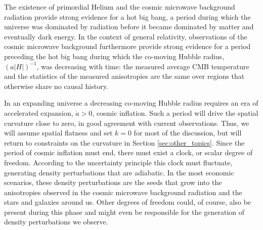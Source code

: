 The existence of primordial Helium and the cosmic microwave background radiation provide strong evidence for a hot big bang, a period during which the universe was dominated by radiation before it became dominated by matter and eventually dark energy. In the context of general relativity, observations of the cosmic microwave background furthermore provide strong evidence for a period preceding the hot big bang during which the co-moving Hubble radius, $(a|H|)^{-1}$, was decreasing with time: the measured average CMB temperature and the statistics of the measured anisotropies are the same over regions that otherwise share no causal history. 


In an expanding universe a decreasing co-moving Hubble radius requires an era of accelerated expansion, $\ddot{a}>0$, cosmic inflation. Such a period will drive the spatial curvature close to zero, in good agreement with current observations. Thus, we will assume spatial flatness and set $k=0$ for most of the discussion, but will return to constraints on the curvature in Section \ref{sec:other_topics}. Since the period of cosmic inflation must end, there must exist a clock, or scalar degree of freedom. According to the uncertainty principle this clock must fluctuate, generating density perturbations that are adiabatic. In the most economic scenarios, these density perturbations are the seeds that grow into the anisotropies observed in the cosmic microwave background radiation and the stars and galaxies around us. Other degrees of freedom could, of course, also be present during this phase and might even be responsible for the generation of density perturbations we observe. 

